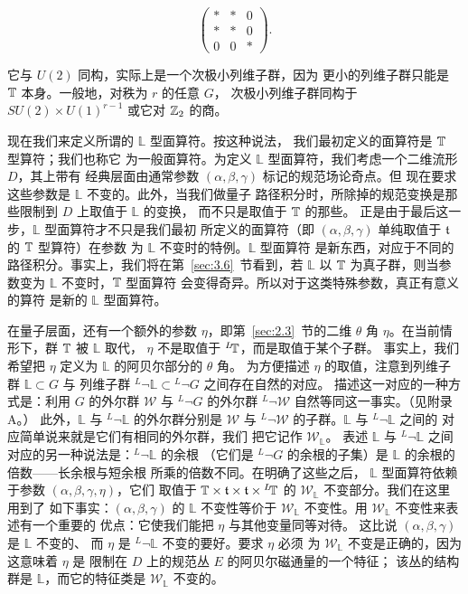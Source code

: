 \setcounter{equation}{54}
\begin{equation}\label{eq:2.55}
  \left(\begin{matrix}* & * & 0 \\
                        * & * & 0 \\
                        0 & 0 & * \end{matrix}\right).
\end{equation}

它与 $U(2)$ 同构，实际上是一个次极小列维子群，因为
更小的列维子群只能是 ${\mathbb{T}}$ 本身。一般地，对秩为 $r$ 的任意 $G$，
次极小列维子群同构于 $SU(2)\times U(1)^{r-1}$
或它对 ${\mathbb{Z}}_2$ 的商。

现在我们来定义所谓的 $\mathbb{L}$ 型面算符。按这种说法，
我们最初定义的面算符是 ${\mathbb{T}}$ 型算符；我们也称它
为一般面算符。为定义 $\mathbb{L}$ 型面算符，我们考虑一个二维流形 $D$，其上带有
经典层面由通常参数 $(\alpha,\beta,\gamma)$ 标记的规范场论奇点。但
现在要求这些参数是 $\mathbb{L}$ 不变的。此外，当我们做量子
路径积分时，所除掉的规范变换是那些限制到 $D$ 上取值于 $\mathbb{L}$ 的变换，
而不只是取值于 ${\mathbb{T}}$ 的那些。
正是由于最后这一步，$\mathbb{L}$ 型面算符才不只是我们最初
所定义的面算符（即 $(\alpha,\beta,
\gamma)$ 单纯取值于 $\mathfrak t$ 的 ${\mathbb{T}}$ 型算符）在参数
为 $\mathbb{L}$ 不变时的特例。$\mathbb{L}$ 型面算符
是新东西，对应于不同的路径积分。事实上，我们将在第~\ref{sec:3.6}~节看到，若 $\mathbb{L}$ 以 ${\mathbb{T}}$
为真子群，则当参数变为 $\mathbb{L}$ 不变时，${\mathbb{T}}$ 型面算符
会变得奇异。所以对于这类特殊参数，真正有意义的算符
是新的 $\mathbb{L}$ 型面算符。


在量子层面，还有一个额外的参数 $\eta$，即第~\ref{sec:2.3}~节的二维
$\theta$ 角 $\eta$。在当前情形下，群 ${\mathbb{T}}$ 被 $\mathbb{L}$ 取代，
$\eta$ 不是取值于 $^L\negthinspace {\mathbb{T}}$，而是取值于某个子群。
事实上，我们希望把 $\eta$ 定义为 $\mathbb{L}$ 的阿贝尔部分的 $\theta$ 角。
为方便描述 $\eta$ 的取值，注意到列维子群 $\mathbb{L}\subset G$ 与
列维子群 $^L\neg \mathbb{L}\subset{} ^L\neg G$ 之间存在自然的对应。
描述这一对应的一种方式是：利用 $G$ 的外尔群 ${\mathcal W}$ 与
$^L\neg G$ 的外尔群 $^L\neg{\mathcal W}$ 自然等同这一事实。（见附录 A。）
此外，$\mathbb{L}$ 与 $^L\neg\mathbb{L}$
的外尔群分别是 ${\mathcal W}$ 与 $^L\neg {\mathcal W}$ 的子群。$\mathbb{L}$ 与 $^L\neg\mathbb{L}$ 之间的
对应简单说来就是它们有相同的外尔群，我们
把它记作 ${\mathcal W}_\mathbb{L}$。
表述 $\mathbb{L}$ 与 $^L\neg \mathbb{L}$ 之间对应的另一种说法是：$^L\neg \mathbb{L}$ 的余根
（它们是 $^L\neg G$ 的余根的子集）是 $\mathbb{L}$ 的余根的倍数——长余根与短余根
所乘的倍数不同。在明确了这些之后，
$\mathbb{L}$ 型面算符依赖于参数 $(\alpha,\beta,\gamma,\eta)$，它们
取值于 ${\mathbb{T}}\times \mathfrak t\times \mathfrak t\times {}^L\negthinspace
{\mathbb{T}}$ 的 ${\mathcal W}_\mathbb{L}$ 不变部分。我们在这里用到了
如下事实：$(\alpha,\beta,\gamma)$ 的 $\mathbb{L}$ 不变性等价于
${\mathcal W}_\mathbb{L}$ 不变性。用 ${\mathcal W}_\mathbb{L}$ 不变性来表述有一个重要的
优点：它使我们能把 $\eta$ 与其他变量同等对待。
这比说 $(\alpha,\beta,\gamma)$ 是 $\mathbb{L}$ 不变的、
而 $\eta$ 是 $^L\neg \mathbb{L}$ 不变的要好。要求 $\eta$ 必须
为 ${\mathcal W}_\mathbb{L}$ 不变是正确的，因为这意味着 $\eta$ 是
限制在 $D$ 上的规范丛 $E$ 的阿贝尔磁通量的一个特征；
该丛的结构群是 $\mathbb{L}$，而它的特征类是
${\mathcal W}_\mathbb{L}$ 不变的。


